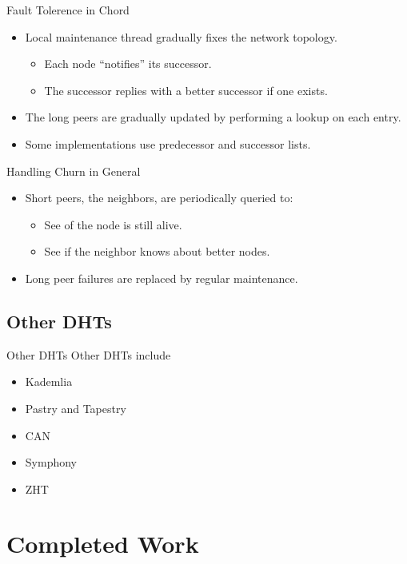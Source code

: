 \documentclass[11pt]{beamer}
\begin{document}
\begin{frame}{Fault Tolerence in Chord}
	\begin{itemize}
		\item Local maintenance thread  gradually fixes the network topology.
		\begin{itemize}
			\item Each node ``notifies'' its successor.
			\item The successor replies with a better successor if one exists.
		\end{itemize}
		\item The long peers are gradually updated by performing a lookup on each entry.
		\item Some implementations use predecessor and successor lists.
	\end{itemize}
\end{frame}



\begin{frame}{Handling Churn in General}
	\begin{itemize}
		\item Short peers, the neighbors, are periodically queried to:
		\begin{itemize}
			\item See of the node is still alive.
			\item See if the neighbor knows about better nodes.
		\end{itemize}
		\item Long peer failures are replaced by regular maintenance.
	\end{itemize}
\end{frame}


\subsection{Other DHTs}
\begin{frame}{Other DHTs}
	Other DHTs include
	\begin{itemize}
		\item Kademlia 
		\item Pastry and Tapestry
		\item CAN
		\item Symphony
		\item ZHT
	\end{itemize}
\end{frame}

\section{Completed Work}
\end{document}
